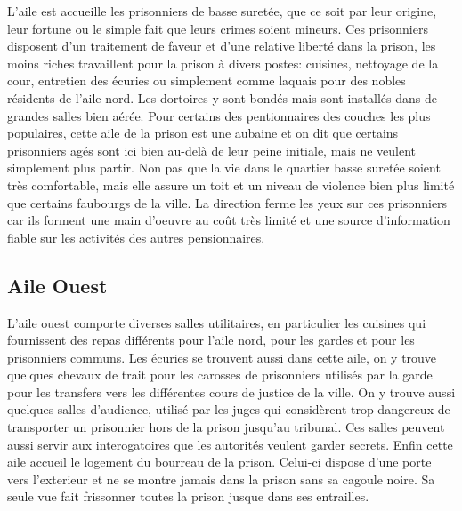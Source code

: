 L'aile est accueille les prisonniers de basse suretée, que ce soit par leur
origine, leur fortune ou le simple fait que leurs crimes soient mineurs. Ces
prisonniers disposent d'un traitement de faveur et d'une relative liberté 
dans la prison, les moins
riches travaillent pour la prison à divers postes: cuisines, nettoyage
de la cour, entretien des écuries ou simplement comme laquais pour 
des nobles résidents de l'aile nord. Les dortoires y sont bondés mais 
sont installés dans de grandes salles bien aérée. Pour certains des
pentionnaires des couches les plus populaires, cette aile de la prison
est une aubaine et on dit que certains prisonniers agés sont ici bien
au-delà de leur peine initiale, mais ne veulent simplement plus partir.
Non pas que la vie dans le quartier basse suretée soient très comfortable,
mais elle assure un toit et un niveau de violence bien plus limité que certains
faubourgs de la ville. La direction ferme les yeux sur ces prisonniers car
ils forment une main d'oeuvre au coût très limité et une source d'information
fiable sur les activités des autres pensionnaires.

\subsection{Aile Ouest}

L'aile ouest comporte diverses salles utilitaires, en particulier les cuisines 
qui fournissent des repas différents pour l'aile nord, pour les gardes et pour 
les prisonniers communs. Les écuries se 
trouvent aussi dans cette aile, on y trouve quelques chevaux de trait pour
les carosses de prisonniers utilisés par la garde pour les transfers vers les 
différentes cours de justice de la ville. On y trouve aussi quelques salles d'audience, utilisé par
les juges qui considèrent trop dangereux de transporter un prisonnier hors de
la prison jusqu'au tribunal. Ces salles peuvent aussi
servir aux interogatoires que les autorités veulent garder secrets. Enfin cette aile
accueil le logement du bourreau de la prison. Celui-ci dispose d'une porte 
vers l'exterieur et ne se montre jamais dans la prison sans sa cagoule 
noire. Sa seule vue fait frissonner toutes la prison jusque dans ses 
entrailles.

